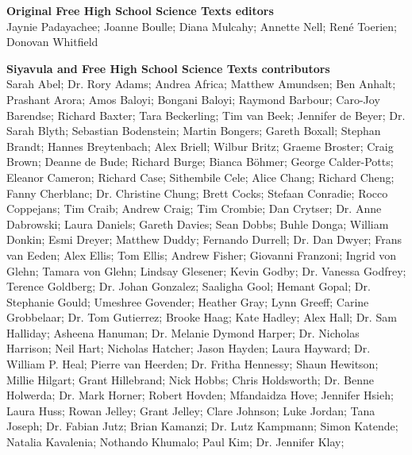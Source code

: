 \textbf{\LARGE Original Free High School Science Texts editors}\\

Jaynie Padayachee; Joanne Boulle; Diana Mulcahy; Annette Nell; René Toerien; Donovan Whitfield \par

\textbf{\LARGE Siyavula and Free High School Science Texts contributors}\\

    Sarah Abel;
Dr. Rory Adams;
    Andrea Africa;
    Matthew Amundsen;
    Ben Anhalt;
    Prashant Arora;
    Amos Baloyi;
    Bongani Baloyi;
    Raymond Barbour;
    Caro-Joy Barendse;
    Richard Baxter;
    Tara Beckerling;
    Tim van Beek;
    Jennifer de Beyer;
Dr. Sarah Blyth;
    Sebastian Bodenstein;
    Martin Bongers;
    Gareth Boxall;
    Stephan Brandt;
    Hannes Breytenbach;
    Alex Briell;
    Wilbur Britz;
    Graeme Broster;
    Craig Brown;
    Deanne de Bude;
    Richard Burge;
    Bianca Böhmer;
    George Calder-Potts;
    Eleanor Cameron;
    Richard Case;
    Sithembile Cele;
    Alice Chang;
    Richard Cheng;
    Fanny Cherblanc;
Dr. Christine Chung;
    Brett Cocks;
    Stefaan Conradie;
    Rocco Coppejans;
    Tim Craib;
    Andrew Craig;
    Tim Crombie;
    Dan Crytser;
Dr. Anne Dabrowski;
    Laura Daniels;
    Gareth Davies;
    Sean Dobbs;
    Buhle Donga;
    William Donkin;
    Esmi Dreyer;
    Matthew Duddy;
    Fernando Durrell;
Dr. Dan Dwyer;
    Frans van Eeden;
    Alex Ellis;
    Tom Ellis;
    Andrew Fisher;
    Giovanni Franzoni;
    Ingrid von Glehn;
    Tamara von Glehn;
    Lindsay Glesener;
    Kevin Godby;
Dr. Vanessa Godfrey;
    Terence Goldberg;
Dr. Johan Gonzalez;
    Saaligha Gool;
    Hemant Gopal;
Dr. Stephanie Gould;
    Umeshree Govender;
    Heather Gray;
    Lynn Greeff;
    Carine Grobbelaar;
Dr. Tom Gutierrez;
    Brooke Haag;
    Kate Hadley;
    Alex Hall;
Dr. Sam Halliday;
    Asheena Hanuman;
Dr. Melanie Dymond Harper;
Dr. Nicholas Harrison;
    Neil Hart;
    Nicholas Hatcher;
    Jason Hayden;
    Laura Hayward;
Dr. William P. Heal;
    Pierre van Heerden;
Dr. Fritha Hennessy;
    Shaun Hewitson;
    Millie Hilgart;
    Grant Hillebrand;
    Nick Hobbs;
    Chris Holdsworth;
Dr. Benne Holwerda;
Dr. Mark Horner;
    Robert Hovden;
    Mfandaidza Hove;
    Jennifer Hsieh;
    Laura Huss;
    Rowan Jelley;
    Grant Jelley;
    Clare Johnson;
    Luke Jordan;
    Tana Joseph;
Dr. Fabian Jutz;
    Brian Kamanzi;
Dr. Lutz Kampmann;
    Simon Katende;
    Natalia Kavalenia;
    Nothando Khumalo;
    Paul Kim;
Dr. Jennifer Klay;
